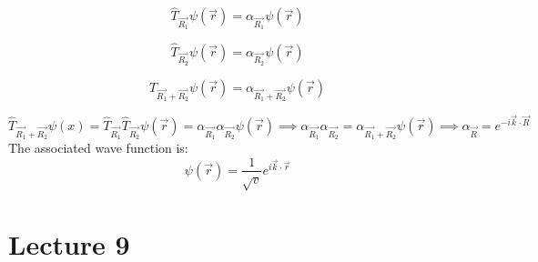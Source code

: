 \documentclass{article}
\begin{document}
$$\hat{T}_{\vec{R_1}} \psi(\vec{r}) = \alpha_{\vec{R_1}} \psi(\vec{r})$$

$$\hat{T}_{\vec{R_2}} \psi(\vec{r}) =  \alpha_{\vec{R_2}}\psi(\vec{r})$$

$$ \hat{T}_{\vec{R_1} + \vec{R_2} } \psi(\vec{r}) = \alpha_{\vec{R_1} + \vec{R_2}} \psi(\vec{r}) $$

$$\hat{T}_{\vec{R_1} + \vec{R_2}} \psi(x) = \hat{T}_{\vec{R_1}}\hat{T}_{\vec{R_2}} \psi(\vec{r}) =\alpha_{\vec{R_1}} \alpha_{\vec{R_2}}\psi(\vec{r})  \implies \alpha_{\vec{R_1}} \alpha_{\vec{R_2}} = \alpha_{\vec{R_1} + \vec{R_2}} \psi(\vec{r}) \implies \alpha_{\vec{R}} = e^{-i\vec{k} \cdot \vec{R}} $$
The associated wave function is:
$$\psi(\vec{r}) = \frac{1}{\sqrt{v}} e^{i\vec{k} \cdot \vec{r}}$$

\section{Lecture 9}
\end{document}
